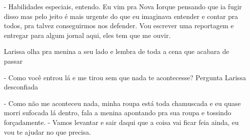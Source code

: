 - Habilidades especiais, entendo. Eu vim pra Nova Iorque pensando que ia fugir disso mas pelo jeito é mais urgente do que eu imaginava entender e contar pra todos, pra talvez conseguirmos nos defender. Vou escrever uma reportagem e entregar para algum jornal aqui, eles tem que me ouvir.

Larissa olha pra menina a seu lado e lembra de toda a cena que acabara de passar

- Como você entrou lá e me tirou sem que nada te acontecesse? Pergunta Larissa desconfiada

- Como não me aconteceu nada, minha roupa está toda chamuscada e eu quase morri sufocada lá dentro, fala a menina apontando pra sua roupa e tossindo forçadamente. - Vamos levantar e sair daqui que a coisa vai ficar feia ainda, eu vou te ajudar no que precisa.
